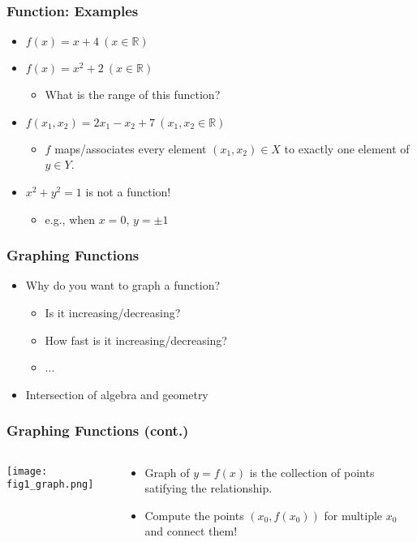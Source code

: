 \documentclass[pdflatex, 12pt]{beamer}
\newcommand{\R}{\mathbb{R}}
\begin{document}
\begin{frame}
\frametitle{Function: Examples}
\begin{itemize}
\item $f(x) = x + 4 \ (x \in \R)$
\vspace{0.4cm}
\item $f(x) = x^2 + 2 \ (x \in \R)$
 \begin{itemize}
 \item What is the range of this function?
 \end{itemize}
\vspace{0.4cm}
\item $f(x_1, x_2) = 2x_1 - x_2 + 7 \ (x_1, x_2 \in \R)$
 \begin{itemize}
 \item $f$ maps/associates every element $(x_1, x_2) \in X$ to exactly one element of $y \in Y$.
 \end{itemize}
\vspace{0.4cm}
\item $x^2 + y^2 = 1$ is not a function!
 \begin{itemize}
 \item e.g., when $x = 0$, $y = \pm 1$
 \end{itemize}
\end{itemize}
\end{frame}

\begin{frame}
\frametitle{Graphing Functions}
\begin{itemize}
\item Why do you want to graph a function?
 \begin{itemize}
 \item Is it increasing/decreasing?
 \item How fast is it increasing/decreasing?
 \item ...
 \end{itemize}
\vspace{0.4cm}
\item Intersection of algebra and geometry
\end{itemize}
\end{frame}

\begin{frame}
\frametitle{Graphing Functions (cont.)}
\begin{columns}
\begin{column}{0.5\textwidth}
\texttt{[image: fig1\_graph.png]}
\end{column}
\begin{column}{0.5\textwidth}
\begin{itemize}
\item Graph of $y = f(x)$ is the collection of points satifying the relationship.
\vspace{0.4cm}
\item Compute the points $(x_0, f(x_0))$ for multiple $x_0$ and connect them!
\end{itemize}
\end{column}
\end{columns}
\end{frame}
\end{document}
